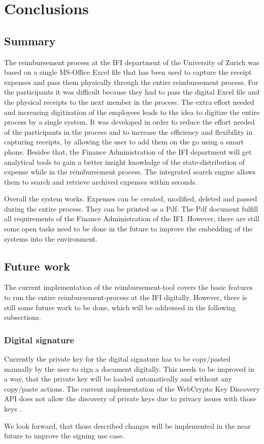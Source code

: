 \chapter{Conclusions}

\section{Summary}

The reimbursement process at the IFI department of the University of Zurich was based on a single MS-Office Excel file that has been used to capture the receipt expenses and pass them physically through the entire reimbursement process. For the participants it was difficult because they had to pass the digital Excel file and the physical receipts to the next member in the process. The extra effort needed and increasing digitization of the employees leads to the idea to digitize the entire process by a single system.\newline
It was developed in order to reduce the effort needed of the participants in the process and to increase the efficiency and flexibility in capturing receipts, by allowing the user to add them on the go using a smart phone. Besides that, the Finance Administration of the IFI department will get analytical tools to gain a better insight knowledge of the state-distribution of expense while in the reimbursement process. The integrated search engine allows them to search and retrieve archived expenses within seconds. \par
Overall the system works. Expenses can be created, modified, deleted and passed during the entire process. They can be printed as a Pdf. The Pdf document fulfill all requirements of the Finance Administration of the IFI. However, there are still some open tasks need to be done in the future to improve the embedding of the systems into the environment. 


\section{Future work}
\label{sec:future-work}

The current implementation of the reimbursement-tool covers the basic features to run the entire reimbursement-process at the IFI digitally. However, there is still some future work to be done, which will be addressed in the following subsections. 

\subsection{Digital signature}
Currently the private key for the digital signature has to be copy/pasted manually by the user to sign a document digitally. This needs to be improved in a way, that the private key will be loaded automatically and without any copy/paste actions. The current implementation of the WebCrypto Key Discovery API does not allow the discovery of private keys due to privacy issues with those keys \cite{webcrypto}. \par
We look forward, that those described changes will be implemented in the near future to improve the signing use case.

